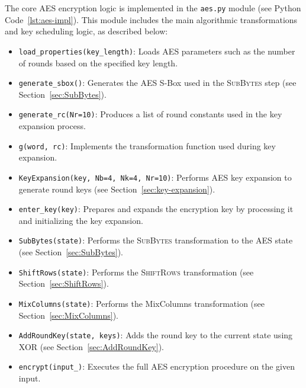 The core AES encryption logic is implemented in the \texttt{aes.py} module (see Python Code~\ref{lst:aes-impl}). 
This module includes the main algorithmic transformations and key scheduling logic, as described below:
\begin{itemize}
    \item \texttt{load\_properties(key\_length)}: Loads AES parameters such as the number of rounds based on the specified key length.
    \item \texttt{generate\_sbox()}: Generates the AES S-Box used in the \textsc{SubBytes} step (see Section~\ref{sec:SubBytes}).
    \item \texttt{generate\_rc(Nr=10)}: Produces a list of round constants used in the key expansion process.
    \item \texttt{g(word, rc)}: Implements the transformation function used during key expansion.
    \item \texttt{KeyExpansion(key, Nb=4, Nk=4, Nr=10)}: Performs AES key expansion to generate round keys (see Section~\ref{sec:key-expansion}).
    \item \texttt{enter\_key(key)}: Prepares and expands the encryption key by processing it and initializing the key expansion.
    \item \texttt{SubBytes(state)}: Performs the \textsc{SubBytes} transformation to the AES state (see Section~\ref{sec:SubBytes}).
    \item \texttt{ShiftRows(state)}: Performs the \textsc{ShiftRows} transformation (see Section~\ref{sec:ShiftRows}).
    \item \texttt{MixColumns(state)}: Performs the MixColumns transformation (see Section~\ref{sec:MixColumns}).
    \item \texttt{AddRoundKey(state, keys)}: Adds the round key to the current state using XOR (see Section~\ref{sec:AddRoundKey}).
    \item \texttt{encrypt(input\_)}: Executes the full AES encryption procedure on the given input.
\end{itemize}